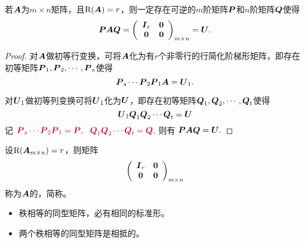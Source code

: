 \begin{frame}
\begin{dingli}
  若$\A$为$m\times n$矩阵，且$\rank(\A)=r$，则一定存在可逆的$m$阶矩阵$\PP$和$n$阶矩阵$\QQ$使得
  $$
  \PP\A\QQ=\left(
    \begin{array}{cc}
      \II_r&\zero\\
      \zero&\zero
    \end{array}
  \right)_{m\times n} = \U.
  $$
\end{dingli}\pause 
\begin{proof}
对$\A$做初等行变换，可将$\A$化为有$r$个非零行的行简化阶梯形矩阵，即存在初等矩阵$\PP_1,\PP_2,\cd,\PP_s$使得
$$
\PP_s\cd\PP_2\PP_1\A=\U_1.
$$

对$\U_1$做初等列变换可将$\U_1$化为$\U$，即存在初等矩阵$\QQ_1,\QQ_2,\cd,\QQ_t$使得
$$
\U_1\QQ_1\QQ_2\cd\QQ_t=\U
$$
记
$
\purple{\PP_s\cd\PP_2\PP_1=\PP, ~~\QQ_1\QQ_2\cd\QQ_t=\QQ,}
$
则有
$
\PP\A\QQ=\U.
$
\end{proof}
\end{frame}

\begin{frame}
\begin{dingyi}[相抵标准形]
  设$\rank(\A_{m\times n})=r$，则矩阵
  $$
  \left(
    \begin{array}{cc}
      \II_r&\zero\\
      \zero&\zero
    \end{array}
  \right)_{m\times n} 
  $$称为$\A$的，简称。
\end{dingyi}
\begin{itemize}
\item 秩相等的同型矩阵，必有相同的标准形。
\item 两个秩相等的同型矩阵是相抵的。
\end{itemize}

\end{frame}


